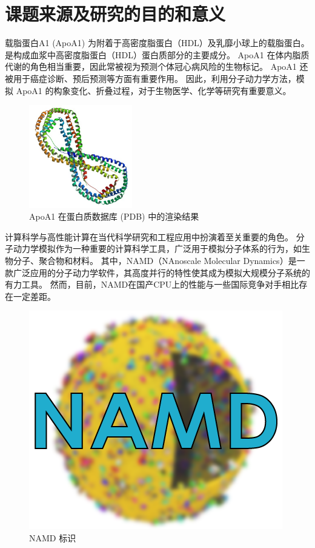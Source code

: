 \section{课题来源及研究的目的和意义}

载脂蛋白A1 (ApoA1) 为附着于高密度脂蛋白（HDL）及乳靡小球上的载脂蛋白。
是构成血浆中高密度脂蛋白（HDL）蛋白质部分的主要成分。
ApoA1 在体内脂质代谢的角色相当重要，因此常被视为预测个体冠心病风险的生物标记。
ApoA1 还被用于癌症诊断\cite{limwjxtd}、预后预测\cite{apoayuhz}等方面有重要作用。
因此，利用分子动力学方法，模拟 ApoA1 的构象变化、折叠过程，对于生物医学、化学等研究有重要意义。


\begin{figure}[h]
    \centering
    \includegraphics[width=0.4\textwidth]{images/PBB_Protein_APOA1_image.jpg}
    \caption{ApoA1 在蛋白质数据库 (PDB) 中的渲染结果}
\end{figure}

计算科学与高性能计算在当代科学研究和工程应用中扮演着至关重要的角色。
分子动力学模拟作为一种重要的计算科学工具，广泛用于模拟分子体系的行为，如生物分子、聚合物和材料。
其中，NAMD（NAnoscale Molecular Dynamics）\cite{phillips2005scalable}是一款广泛应用的分子动力学软件，其高度并行的特性使其成为模拟大规模分子系统的有力工具。
然而，目前，NAMD在国产CPU上的性能与一些国际竞争对手相比存在一定差距。


\begin{figure}[h]
    \centering
    \includegraphics{images/namd-logo.png}
    \caption{NAMD 标识}
\end{figure}

